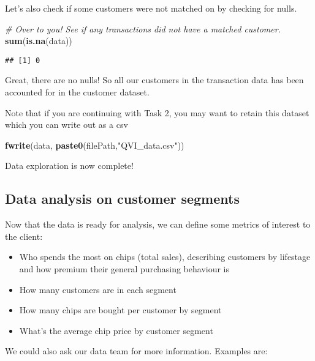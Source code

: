 \documentclass[
]{article}
\newenvironment{Shaded}{\begin{snugshade}}{\end{snugshade}}
\newcommand{\CommentTok}[1]{\textcolor[rgb]{0.56,0.35,0.01}{\textit{#1}}}
\newcommand{\FunctionTok}[1]{\textcolor[rgb]{0.13,0.29,0.53}{\textbf{#1}}}
\newcommand{\NormalTok}[1]{#1}
\newcommand{\StringTok}[1]{\textcolor[rgb]{0.31,0.60,0.02}{#1}}
\providecommand{\tightlist}{%
  \setlength{\itemsep}{0pt}\setlength{\parskip}{0pt}}
\begin{document}
Let's also check if some customers were not matched on by checking for
nulls.

\begin{Shaded}
\begin{Highlighting}[]
\CommentTok{\# Over to you! See if any transactions did not have a matched customer.}
\FunctionTok{sum}\NormalTok{(}\FunctionTok{is.na}\NormalTok{(data))}
\end{Highlighting}
\end{Shaded}

\begin{verbatim}
## [1] 0
\end{verbatim}

Great, there are no nulls! So all our customers in the transaction data
has been accounted for in the customer dataset.

Note that if you are continuing with Task 2, you may want to retain this
dataset which you can write out as a csv

\begin{Shaded}
\begin{Highlighting}[]
\FunctionTok{fwrite}\NormalTok{(data, }\FunctionTok{paste0}\NormalTok{(filePath,}\StringTok{"QVI\_data.csv"}\NormalTok{))}
\end{Highlighting}
\end{Shaded}

Data exploration is now complete!

\subsection{Data analysis on customer
segments}\label{data-analysis-on-customer-segments}

Now that the data is ready for analysis, we can define some metrics of
interest to the client:

\begin{itemize}
\tightlist
\item
  Who spends the most on chips (total sales), describing customers by
  lifestage and how premium their general purchasing behaviour is
\item
  How many customers are in each segment
\item
  How many chips are bought per customer by segment
\item
  What's the average chip price by customer segment
\end{itemize}

We could also ask our data team for more information. Examples are:
\end{document}
